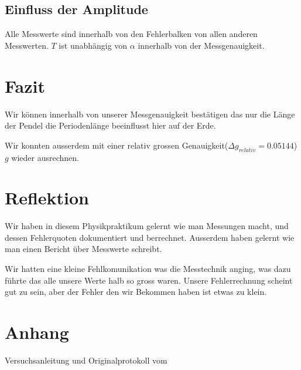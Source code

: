 \documentclass[12pt, a4paper, twoside]{article}
\begin{document}
\subsection{Einfluss der Amplitude}
\begin{center}
\end{center}

Alle Messwerte sind innerhalb von den Fehlerbalken von allen anderen Messwerten.
$T$ ist unabhängig von $\alpha$ innerhalb von der Messgenauigkeit.
\section{Fazit}
Wir können innerhalb von unserer Messgenauigkeit bestätigen das nur die Länge der Pendel die Periodenlänge beeinflusst hier auf der Erde.
\par
Wir konnten ausserdem mit einer relativ grossen Genauigkeit($\Delta g_{relativ} = 0.05144$) $g$ wieder ausrechnen.


\section{Reflektion}
Wir haben in diesem Physikpraktikum gelernt wie man Messungen macht, und dessen Fehlerquoten dokumentiert und berrechnet.
Ausserdem haben gelernt wie man einen Bericht über Messwerte schreibt.

Wir hatten eine kleine Fehlkomunikation was die Messtechnik anging, was dazu führte das alle unsere Werte halb so gross waren.
Unsere Fehlerrechnung scheint gut zu sein, aber der Fehler den wir Bekommen haben ist etwas zu klein.
\section{Anhang}
Versuchsanleitung und Originalprotokoll vom \labdate
\end{document}
